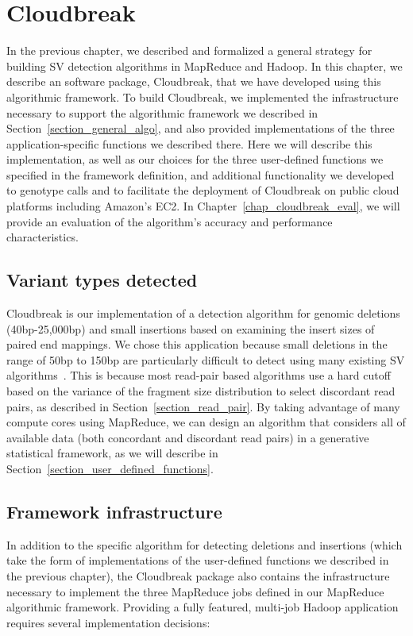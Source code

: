 \chapter{Cloudbreak}\label{chap_cloudbreak_impl}

In the previous chapter, we described and formalized a general strategy for building SV detection algorithms in MapReduce and Hadoop. In this chapter, we describe an software package, Cloudbreak, that we have developed using this algorithmic framework. To build Cloudbreak, we implemented the infrastructure necessary to support the algorithmic framework we described in Section~\ref{section_general_algo}, and also provided implementations of the three application-specific functions we described there. Here we will describe this implementation, as well as our choices for the three user-defined functions we specified in the framework definition, and additional functionality we developed to genotype calls and to facilitate the deployment of Cloudbreak on public cloud platforms including Amazon's EC2. In Chapter~\ref{chap_cloudbreak_eval}, we will provide an evaluation of the algorithm's accuracy and performance characteristics.

\section{Variant types detected}

Cloudbreak is our implementation of a detection algorithm for genomic deletions (40bp-25,000bp) and small insertions based on examining the insert sizes of paired end mappings. We chose this application because small deletions in the range of 50bp to 150bp are particularly difficult to detect using many existing SV algorithms~\cite{Alkan:2011p547,Mills:2011fi}. This is because most read-pair based algorithms use a hard cutoff based on the variance of the fragment size distribution to select discordant read pairs, as described in Section~\ref{section_read_pair}. By taking advantage of many compute cores using MapReduce, we can design an algorithm that considers all of available data (both concordant and discordant read pairs) in a generative statistical framework, as we will describe in Section~\ref{section_user_defined_functions}.

\section{Framework infrastructure}

In addition to the specific algorithm for detecting deletions and insertions (which take the form of implementations of the user-defined functions we described in the previous chapter), the Cloudbreak package also contains the infrastructure necessary to implement the three MapReduce jobs defined in our MapReduce algorithmic framework. Providing a fully featured, multi-job Hadoop application requires several implementation decisions:

